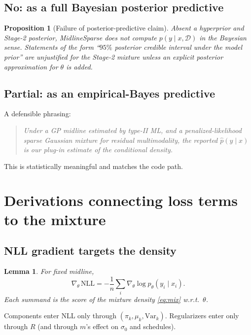 \documentclass[11pt,a4paper]{article}
\theoremstyle{plain}
\newtheorem{proposition}[theorem]{Proposition}
\newtheorem{lemma}[theorem]{Lemma}
\theoremstyle{definition}
\theoremstyle{remark}
\newcommand{\D}{\mathcal{D}}
\newcommand{\tht}{\theta}
\begin{document}
\subsection{No: as a full Bayesian posterior predictive}
\begin{proposition}[Failure of posterior-predictive claim]
Absent a hyperprior and Stage-2 posterior, MidlineSparse does not compute
\(p(y\mid x,\D)\) in the Bayesian sense. Statements of the form
``\(95\%\) posterior credible interval under the model prior'' are unjustified for the
Stage-2 mixture unless an explicit posterior approximation for \(\tht\) is added.
\end{proposition}

\subsection{Partial: as an empirical-Bayes predictive}
A defensible phrasing:
\begin{quote}
\emph{Under a GP midline estimated by type-II ML, and a penalized-likelihood sparse
Gaussian mixture for residual multimodality, the reported \(\hat p(y\mid x)\) is our
plug-in estimate of the conditional density.}
\end{quote}
This is statistically meaningful and matches the code path.

\section{Derivations connecting loss terms to the mixture}

\subsection{NLL gradient targets the density}
\begin{lemma}
For fixed midline,
\[
  \nabla_\tht\,\mathrm{NLL}
  =
  -\frac1n\sum_i
  \nabla_\tht\log p_\tht(y_i\mid x_i).
\]
Each summand is the score of the mixture density \eqref{eq:mix} w.r.t.\ \(\tht\).
\end{lemma}

Components enter NLL only through \((\pi_k,\mu_k,\mathrm{Var}_k)\). Regularizers enter
only through \(R\) (and through \(m\)'s effect on \(\sigma_0\) and schedules).
\end{document}
